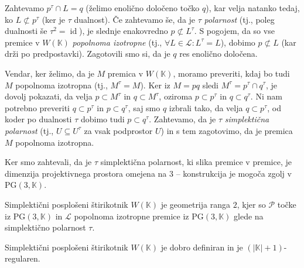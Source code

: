 \documentclass[fin1, tisk]{fmfdelo}
\newcommand{\PP}{\mathcal{P}}
\newcommand{\LL}{\mathcal{L}}
\newcommand{\PG}{\mathrm{PG}}
\newcommand{\id}{\operatorname{id}}
\begin{document}
    Zahtevamo $p^\tau\cap L = q$ (želimo enolično določeno točko $q$), kar velja natanko tedaj, ko $L\not\subset p^\tau$ (ker je $\tau$ dualnost). 
    Če zahtevamo še, da je $\tau$ \emph{polarnost} (tj., poleg dualnosti še $\tau^2 = \id$), je slednje
    enakovredno $p\not\subset L^\tau$. S pogojem, da so vse premice v $W(\mathbb{K})$ 
    \emph{popolnoma izotropne} (tj., $\forall L\in\LL: L^\tau = L$), dobimo $p\not\subset L$ (kar drži po predpostavki).
    Zagotovili smo si,
    da je $q$ res enolično določena.

    Vendar, ker želimo, da je $M$ premica v $W(\mathbb{K})$, moramo preveriti, kdaj bo tudi $M$ popolnoma izotropna (tj., $M^\tau = M$). Ker iz $M=pq$
    sledi $M^\tau = p^\tau \cap q^\tau$, je dovolj pokazati, da velja $p\subset M^\tau$ in $q\subset M^\tau$, oziroma
    $p\subset p^\tau$ in $q\subset q^\tau$. Ni nam potrebno preveriti $q\subset p^\tau$ in $p\subset q^\tau$, saj
    smo $q$ izbrali tako, da velja $q\subset p^\tau$, od koder po dualnosti $\tau$ dobimo tudi $p\subset q^\tau$.
    Zahtevamo, da je $\tau$ \emph{simplektična polarnost} (tj., $U \subseteq U^\tau$ za vsak podprostor $U$) in 
    s tem zagotovimo, da je premica $M$ popolnoma izotropna.

    Ker smo zahtevali, da je $\tau$ simplektična polarnost, ki slika premice v premice, je dimenzija projektivnega prostora omejena na $3$ --
    konstrukcija je mogoča zgolj v $\PG(3, \mathbb{K})$.

\begin{definicija}\label{def:simplekticni_gq}
    Simplektični posplošeni štirikotnik $W(\mathbb{K})$ je geometrija ranga $2$, kjer so 
    $\PP$ točke iz $\PG(3, \mathbb{K})$ in $\LL$ popolnoma izotropne premice iz $\PG(3, \mathbb{K})$ glede
    na simplektično polarnost $\tau$.
\end{definicija}

\begin{trditev}
    Simplektični posplošeni štirikotnik $W(\mathbb{K})$ je dobro definiran in je 
    $(|\mathbb{K}| + 1)$-regularen.
\end{trditev}
\end{document}
